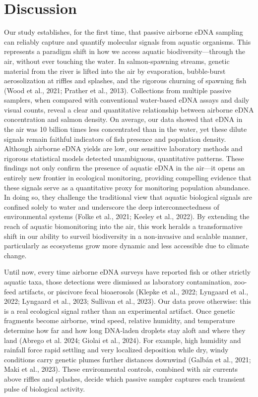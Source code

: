 \documentclass{article}
\begin{document}
\section{Discussion}
Our study establishes, for the first time, that passive airborne eDNA sampling can reliably capture and quantify molecular signals from aquatic organisms. This represents a paradigm shift in how we access aquatic biodiversity—through the air, without ever touching the water. In salmon-spawning streams, genetic material from the river is lifted into the air by evaporation, bubble-burst aerosolization at riffles and splashes, and the rigorous churning of spawning fish (Wood et al., 2021; Prather et al., 2013). Collections from multiple passive samplers, when compared with conventional water-based eDNA assays and daily visual counts, reveal a clear and quantitative relationship between airborne eDNA concentration and salmon density. On average, our data showed that eDNA in the air was 10 billion times less concentrated than in the water, yet these dilute signals remain faithful indicators of fish presence and population density. Although airborne eDNA yields are low, our sensitive laboratory methods and rigorous statistical models detected unambiguous, quantitative patterns. These findings not only confirm the presence of aquatic eDNA in the air—it opens an entirely new frontier in ecological monitoring, providing compelling evidence that these signals serve as a quantitative proxy for monitoring population abundance. In doing so, they challenge the traditional view that aquatic biological signals are confined solely to water and underscore the deep interconnectedness of environmental systems (Folke et al., 2021; Keeley et al., 2022). By extending the reach of aquatic biomonitoring into the air, this work heralds a transformative shift in our ability to surveil biodiversity in a non-invasive and scalable manner, particularly as ecosystems grow more dynamic and less accessible due to climate change.

Until now, every time airborne eDNA surveys have reported fish or other strictly aquatic taxa, those detections were dismissed as laboratory contamination, zoo-feed artifacts, or piscivore fecal bioaerosols (Klepke et al., 2022; Lyngaard et al., 2022; Lyngaard et al., 2023; Sullivan et al., 2023). Our data prove otherwise: this is a real ecological signal rather than an experimental artifact. Once genetic fragments become airborne, wind speed, relative humidity, and temperature determine how far and how long DNA-laden droplets stay aloft and where they land (Abrego et al. 2024; Giolai et al., 2024). For example, high humidity and rainfall force rapid settling and very localized deposition while dry, windy conditions carry genetic plumes further distances downwind (Galbán et al., 2021; Maki et al., 2023). These environmental controls, combined with air currents above riffles and splashes, decide which passive sampler captures each transient pulse of biological activity.
\end{document}
